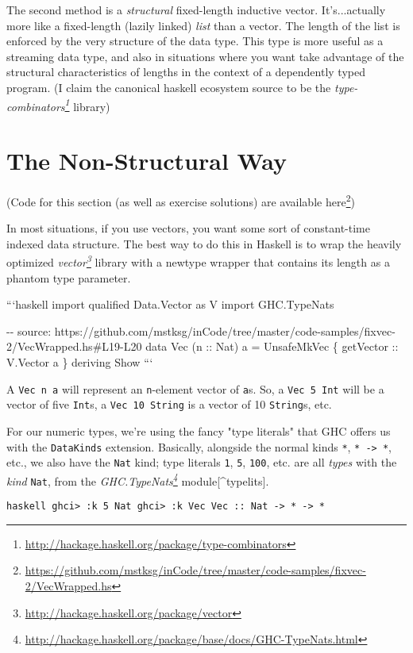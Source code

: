 \documentclass[]{article}
\renewcommand{\href}[2]{#2\footnote{\url{#1}}}
\begin{document}
The second method is a \emph{structural} fixed-length inductive vector.
It's...actually more like a fixed-length (lazily linked) \emph{list} than a
vector. The length of the list is enforced by the very structure of the data
type. This type is more useful as a streaming data type, and also in situations
where you want take advantage of the structural characteristics of lengths in
the context of a dependently typed program. (I claim the canonical haskell
ecosystem source to be the
\emph{\href{http://hackage.haskell.org/package/type-combinators}{type-combinators}}
library)

\section{The Non-Structural Way}

(Code for this section (as well as exercise solutions) are
\href{https://github.com/mstksg/inCode/tree/master/code-samples/fixvec-2/VecWrapped.hs}{available
here})

In most situations, if you use vectors, you want some sort of constant-time
indexed data structure. The best way to do this in Haskell is to wrap the
heavily optimized
\emph{\href{http://hackage.haskell.org/package/vector}{vector}} library with a
newtype wrapper that contains its length as a phantom type parameter.

```haskell import qualified Data.Vector as V import GHC.TypeNats

-\/- source:
https://github.com/mstksg/inCode/tree/master/code-samples/fixvec-2/VecWrapped.hs\#L19-L20
data Vec (n :: Nat) a = UnsafeMkVec \{ getVector :: V.Vector a \} deriving Show
```

A \texttt{Vec\ n\ a} will represent an \texttt{n}-element vector of \texttt{a}s.
So, a \texttt{Vec\ 5\ Int} will be a vector of five \texttt{Int}s, a
\texttt{Vec\ 10\ String} is a vector of 10 \texttt{String}s, etc.

For our numeric types, we're using the fancy "type literals" that GHC offers us
with the \texttt{DataKinds} extension. Basically, alongside the normal kinds
\texttt{*}, \texttt{*\ -\textgreater{}\ *}, etc., we also have the \texttt{Nat}
kind; type literals \texttt{1}, \texttt{5}, \texttt{100}, etc. are all
\emph{types} with the \emph{kind} \texttt{Nat}, from the
\emph{\href{http://hackage.haskell.org/package/base/docs/GHC-TypeNats.html}{GHC.TypeNats}}
module{[}\^{}typelits{]}.

\texttt{haskell\ ghci\textgreater{}\ :k\ 5\ Nat\ ghci\textgreater{}\ :k\ Vec\ Vec\ ::\ Nat\ -\textgreater{}\ *\ -\textgreater{}\ *}
\end{document}
